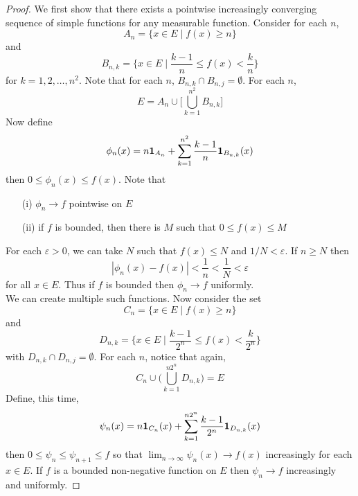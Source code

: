 \begin{proof}
We first show that there exists a pointwise increasingly converging sequence of simple functions for any measurable function. Consider for each $n$, 
\[A_{n}=\{x\in E \;|\; f(x)\geq n\}\] 
and
\[B_{n,k}=\{x\in E \;|\;\dfrac{k-1}{n}\leq f(x)<\dfrac{k}{n} \}\]
for $k=1,2,\ldots ,n^2$. Note that for each $n$, $B_{n,k}\cap B_{n,j}=\emptyset$. For each $n$,
\[E=A_{n}\cup \Big[\bigcup ^{n^2}_{k=1}B_{n,k}\Big]\]
Now define
\[\phi _{n}(x)=n{\bf 1} _{A_{n}}+\sum ^{n^2}_{k=1}\dfrac{k-1}{n}{\bf 1} _{B_{n,k}}(x)\]
then $0\leq \phi _{n}(x)\leq f(x)$. Note that
\begin{itemize}
	\item[(i)] $\phi _{n}\rightarrow f$ pointwise on $E$
	\item[(ii)] if $f$ is bounded, then there is $M$ such that $0\leq f(x)\leq M$
\end{itemize}
For each $\varepsilon >0$, we can take $N$ such that $f(x)\leq N$ and $1/N<\varepsilon $. If $n\geq N$ then
\[|\phi _{n}(x)-f(x)|<\dfrac{1}{n}<\dfrac{1}{N}<\varepsilon \]
for all $x\in E$. Thus if $f$ is bounded then $\phi _{n}\rightarrow f$ uniformly.	
\\
We can create multiple such functions. Now consider the set
\[C_{n}=\{x\in E \;|\; f(x)\geq n\}\]
and
\[D_{n,k}=\{x\in E \;|\; \dfrac{k-1}{2^{n}}\leq f(x)<\dfrac{k}{2^{n}}\}\]
with $D_{n,k}\cap D_{n,j}=\emptyset$. For each $n$, notice that again,
\[C_{n}\cup \Big(\bigcup _{k=1}^{n 2^{n}}D_{n,k}\Big)=E\]
Define, this time, 
\[\psi _{n}(x)=n{\bf 1} _{C_{n}}(x)+\sum ^{n2^{n}}_{k=1}\dfrac{k-1}{2^{n}}{\bf 1} _{D_{n,k}}(x)\]
then $0\leq \psi _{n}\leq \psi _{n+1}\leq f$ so that $\lim _{n\rightarrow \infty }\psi _{n}(x)\rightarrow f(x)$ increasingly for each $x\in E$. If $f$ is a bounded non-negative function on $E$ then $\psi _{n}\rightarrow f$ increasingly and uniformly.
\end{proof}
\vspace{2ex}

